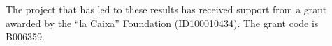 
\newpage
\null
\vfill

\begin{center}
The project that has led to these results has received support from a grant awarded by the “la Caixa” Foundation (ID100010434). The grant code is B006359.
\end{center}

\vfill
\null
